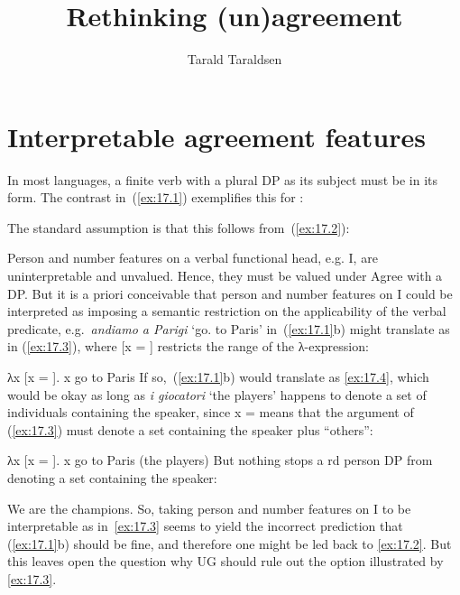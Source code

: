 \documentclass[output=paper]{langsci/langscibook}
\author{Tarald Taraldsen\affiliation{University of Tromsø \& Masaryk University}}
\title{Rethinking (un)agreement}
\begin{document}
\glsresetall
\maketitle

\section{Interpretable agreement features}\label{sec:17.1}

In most languages, a finite verb with a plural DP as its subject must be in its
\Tpl{} form. The contrast in~(\ref{ex:17.1}) exemplifies this for :

\ea\label{ex:17.1} 
    \ea[]{%
    \gll I giocatori vanno a Parigi.\\
        the players go.\Tpl{} to Paris\\
    \glt}
    \z
\z
The standard assumption is that this follows from~(\ref{ex:17.2}):

\ea\label{ex:17.2}
    \ea Person and number features on a verbal functional head, e.g. I, are
    uninterpretable and unvalued.
    \ex Hence, they must be valued under Agree with a DP.
    \z
\z
But it is a priori conceivable that person and number features on I could be
interpreted as imposing a semantic restriction on the applicability of the
verbal predicate, e.g.\ \emph{andiamo a Parigi} ‘go.\Fpl{} to Paris’
in~(\ref{ex:17.1}b) might translate as in (\ref{ex:17.3}), where [x = \Fpl{}]
restricts the range of the λ-expression:

\ea\label{ex:17.3}
    λx [x = \Fpl{}]. x go to Paris
\z
If so,~(\ref{ex:17.1}b) would translate as \eqref{ex:17.4}, which would be okay as long as
\emph{i giocatori} ‘the players’ happens to denote a set of individuals
containing the speaker, since x = \Fpl{} means that the argument of
(\ref{ex:17.3}) must denote a set containing the speaker plus “others”:

\ea\label{ex:17.4}
    λx [x = \Fpl{}]. x go to Paris (the players)
\z
But nothing stops a \Third{}rd person DP from denoting a set containing the
speaker:

\ea\label{ex:17.5}
    We are the champions.
\z
So, taking person and number features on I to be interpretable as
in~\eqref{ex:17.3} seems to yield the incorrect prediction that
(\ref{ex:17.1}b) should be fine, and therefore one might be led back to
\eqref{ex:17.2}. But this leaves open the question why UG should rule out
the option illustrated by \eqref{ex:17.3}.
\end{document}
